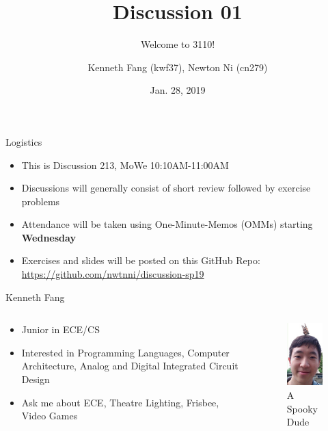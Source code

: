 \documentclass{beamer}
\title{Discussion 01}
\subtitle{Welcome to 3110!}
\author{Kenneth Fang (kwf37), Newton Ni (cn279)}
\date{Jan. 28, 2019}
\begin{document}
    \begin{frame}
        \titlepage{}
    \end{frame}
    
    \begin{frame}{Logistics}
    \begin{itemize}
        \item This is Discussion 213, MoWe 10:10AM-11:00AM
        \item Discussions will generally consist of short review followed by exercise problems
        \item Attendance will be taken using One-Minute-Memos (OMMs) starting \textbf{Wednesday}
        \item Exercises and slides will be posted on this GitHub Repo: \url{https://github.com/nwtnni/discussion-sp19}
    \end{itemize}
    \end{frame}
    
    
    \begin{frame}{Kenneth Fang}
    \begin{columns}
        \begin{column}{0.48\textwidth}
            \begin{itemize}
                \item Junior in ECE/CS
                \item Interested in Programming Languages, Computer Architecture, Analog and Digital Integrated Circuit Design
                \item Ask me about ECE, Theatre Lighting, Frisbee, Video Games
            \end{itemize}
        \end{column}
        \begin{column}{0.48\textwidth}
            \begin{figure}
                \centering
                \includegraphics[scale=0.8]{kwf37.jpg}
                \caption{A Spooky Dude}
            \end{figure}
        \end{column}
    \end{columns}
    \end{frame}
    
\end{document}
